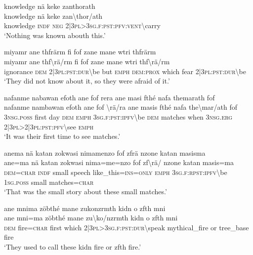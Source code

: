\ea\label{ex:11:a2594}
knowledge nä keke zanthorath\\
\gll knowledge	nä	keke	zan{\textbackslash}thor/ath\\
     knowledge	\textsc{indf}	\textsc{neg}	2|3\textsc{pl}>3\textsc{sg}.\textsc{f}:\textsc{pst}:\textsc{pfv}:\textsc{vent}{\textbackslash}carry\\
\glt `Nothing was known abouth this.'
\z

\ea\label{ex:11:a2595}
miyamr ane thfrärm fi fof zane mane wtri thfrärm\\
\gll miyamr	ane	thf{\textbackslash}rä/rm	fi	fof	zane	mane	wtri	thf{\textbackslash}rä/rm\\
     ignorance	\textsc{dem}	2|3\textsc{pl}:\textsc{pst}:\textsc{dur}{\textbackslash}be	but	\textsc{emph}	\textsc{dem}:\textsc{prox}	which	fear	2|3\textsc{pl}:\textsc{pst}:\textsc{dur}{\textbackslash}be\\
\glt `They did not know about it, so they were afraid of it.'
\z

\ea\label{ex:11:a2597}
nafanme nabawan efoth ane fof rera ane masi fthé nafa themarath fof\\
\gll nafanme	nambawan	efoth	ane	fof	{\textbackslash}rä/ra	ane	masis	fthé	nafa	the{\textbackslash}mar/ath	fof\\
     3\textsc{nsg}.\textsc{poss}	first	day	\textsc{dem}	\textsc{emph}	3\textsc{sg}.\textsc{f}:\textsc{pst}:\textsc{ipfv}{\textbackslash}be	\textsc{dem}	matches	when	3\textsc{nsg}.\textsc{erg}	2|3\textsc{pl}>2|3\textsc{pl}:\textsc{pst}:\textsc{pfv}{\textbackslash}see	\textsc{emph}\\
\glt `It was their first time to see matches.'
\z

\newpage
\ea\label{ex:11:a2599}
anema nä katan zokwasi nimamenzo fof zfrä nzone katan masisma\\
\gll ane=ma	nä	katan	zokwasi	nima=me=nzo	fof	zf{\textbackslash}rä/	nzone	katan	masis=ma\\
     \textsc{dem}=\textsc{char}	\textsc{indf}	small	speech	like\_this=\textsc{ins}=\textsc{only}	\textsc{emph}	3\textsc{sg}.\textsc{f}:\textsc{rpst}:\textsc{ipfv}{\textbackslash}be	1\textsc{sg}.\textsc{poss}	small	matches=\textsc{char}\\
\glt `That was the small story about these small matches.'
\z

\ea\label{ex:11:a2600}
ane mnima zöbthé mane zukonzrmth kidn o zfth mni\\
\gll ane	mni=ma	zöbthé	mane	zu{\textbackslash}ko/nzrmth	kidn	o	zfth	mni\\
     \textsc{dem}	fire=\textsc{char}	first	which	2|3\textsc{pl}>3\textsc{sg}.\textsc{f}:\textsc{pst}:\textsc{dur}{\textbackslash}speak	mythical\_fire	or	tree\_base	fire\\
\glt `They used to call these kidn fire or zfth fire.'
\z

